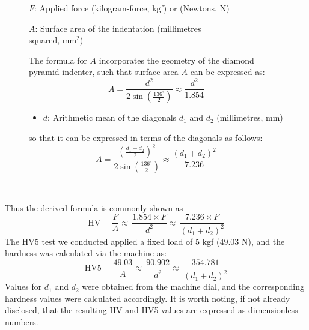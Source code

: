\documentclass{article}
\newcommand{\wm}[1]{%
    \begin{minipage}{1\textwidth}
        #1
    \end{minipage}%
}
\begin{document}
\begin{figure}[H]
\begin{minipage}{0.51\textwidth}
\begin{itemize}[itemsep=-1mm]
                \item \(F\): Applied force (kilogram-force, \(\text{kgf}\)) or (Newtons, \(\text{N}\))
                \wm{\item \(A\): Surface area of the indentation (millimetres \\squared, \(\text{mm}^2\))}            
            \end{itemize}
            The formula for $A$ incorporates the geometry of the diamond pyramid indenter, such that surface area \(A\) can be expressed as:
            \begin{equation}
                A = \frac{d^2}{2\sin\left(\frac{136^\circ}{2}\right)} \approx \frac{d^2}{1.854} 
            \end{equation}
            \begin{itemize}[itemsep=-1mm]
                \item \( d \): Arithmetic mean of the diagonals \( d_1 \) and \( d_2 \) (millimetres, \(\text{mm}\))
            \end{itemize}
            so that it can be expressed in terms of the diagonals as follows:
            \begin{equation}
                A= \frac{\left(\frac{d_1+d_2}{2}\right)^2}{2\sin\left(\frac{136^\circ}{2}\right)} \approx \frac{\left(d_1 + d_2\right)^2}{7.236}
            \end{equation}
        \end{minipage}\\
    \end{figure}
    \vspace{-1em}\noindent
    Thus the derived formula is commonly shown as
    \begin{equation}
        {\text{HV} = \frac{F}{A} \approx \, \frac{1.854 \times F}{d^2} \approx \, \frac{7.236\times F}{\left(d_1 + d_2\right)^2}}    
    \end{equation} 
    The HV5 test we conducted applied a fixed load of 5 kgf (49.03 N), and the hardness was calculated via the machine as:  
    \begin{equation}
        \text{HV5} = \frac{49.03}{A} \approx \, \frac{90.902}{d^2} \approx \, \frac{354.781}{\left(d_1 + d_2\right)^2}
    \end{equation}
    Values for \(d_1\) and \(d_2\) were obtained from the machine dial, and the corresponding hardness values were calculated accordingly. It is worth noting, if not already disclosed, that the resulting HV and HV5 values are expressed as dimensionless numbers. \\[1em]
\end{document}
